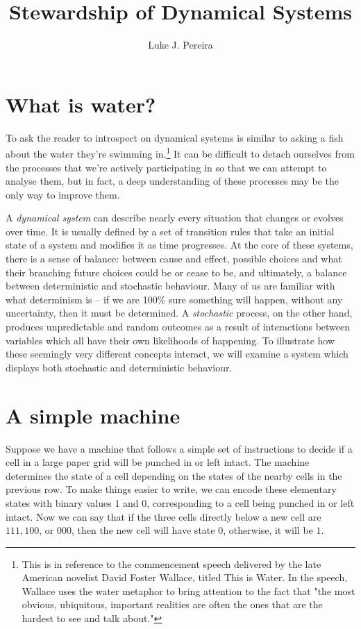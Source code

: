 \documentclass{article}
\title{
    Stewardship of Dynamical Systems
}
\author{Luke J. Pereira}
\date{}
\begin{document}
\maketitle

\section{What is water? }
To ask the reader to introspect on dynamical systems is similar to asking a fish about the water they're swimming in.\footnote
{
    This is in reference to the commencement speech delivered by the late American novelist David Foster Wallace, titled This is Water\cite{dfw}. In the speech, Wallace uses the water metaphor to bring attention to the fact that "the most obvious, ubiquitous, important realities are often the ones that are the hardest to see and talk about."
}
It can be difficult to detach ourselves from the processes that we're actively participating in so that we can attempt to analyse them, but in fact, a deep understanding of these processes may be the only way to improve them. 

A \emph{dynamical system} can describe nearly every situation that changes or evolves over time. It is usually defined by a set of transition rules that take an initial state of a system and modifies it as time progresses. At the core of these systems, there is a sense of balance: between cause and effect, possible choices and what their branching future choices could be or cease to be, and ultimately, a balance between deterministic and stochastic behaviour. Many of us are familiar with what determinism is -- if we are 100\% sure something will happen, without any uncertainty, then it must be determined. A \emph{stochastic} process, on the other hand, produces unpredictable and random outcomes as a result of interactions between variables which all have their own likelihoods of happening. To illustrate how these seemingly very different concepts interact, we will examine a system which displays both stochastic and deterministic behaviour.


\section{A simple machine}
 Suppose we have a machine that follows a simple set of instructions to decide if a cell in a large paper grid will be punched in or left intact. The machine determines the state of a cell depending on the states of the nearby cells in the previous row. To make things easier to write, we can encode these elementary states with binary values $1$ and $0$, corresponding to a cell being punched in or left intact. Now we can say that if the three cells directly below a new cell are $111, 100$, or $000$, then the new cell will have state $0$, otherwise, it will be $1$.
 
\end{document}
